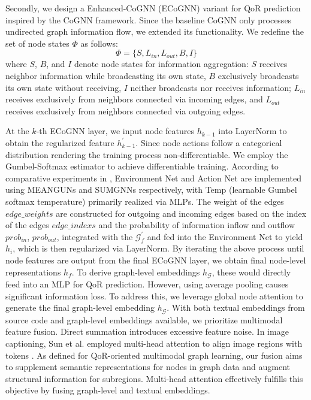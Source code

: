 \documentclass[conference]{IEEEtran}
\begin{document}
		Secondly, we design a Enhanced-CoGNN (ECoGNN) variant for QoR prediction inspired by the CoGNN \cite{Finkelshtein2024} framework. Since the baseline CoGNN only processes undirected graph information flow, we extended its functionality. We redefine the set of node states $\Phi$ as follows:
		\begin{equation}
			\Phi = \{S, L_{in}, L_{out}, B, I\}
		\end{equation}
		where $S$, $B$, and $I$ denote node states for information aggregation: $S$ receives neighbor information while broadcasting its own state, $B$ exclusively broadcasts its own state without receiving, $I$ neither broadcasts nor receives information; $L_{in}$ receives exclusively from neighbors connected via incoming edges, and $L_{out}$ receives exclusively from neighbors connected via outgoing edges. 
		
		At the $k$-th ECoGNN layer, we input node features $h_{k-1}$ into LayerNorm \cite{Ba2016} to obtain the regularized feature $h_{k-1}^{'}$. Since node actions follow a categorical distribution rendering the training process non-differentiable. We employ the Gumbel-Softmax estimator \cite{Jang2017} to achieve differentiable training. According to comparative experiments in \cite{xu2025}, Environment Net and Action Net are implemented using MEANGUNs \cite{Hamilton} and SUMGNNs \cite{Hamilton} respectively, with Temp (learnable Gumbel softmax temperature) primarily realized via MLPs. The weight of the edges $edge\_weights$ are constructed for outgoing and incoming edges based on the index of the edges $edge\_indexs$  and the probability of information inflow and outflow $prob_{in}$, $prob_{out}$, integrated with the $\mathcal{G}_{f}^{'}$ and fed into the Environment Net to yield $h_{i}$, which is then regularized via LayerNorm. By iterating the above process until node features are output from the final ECoGNN layer, we obtain final node-level representations $h_{f}$. To derive graph-level embeddings $h_{\mathcal{G}}$, these would directly feed into an MLP for QoR prediction. However, using average pooling causes significant information loss. To address this, we leverage global node attention \cite{Li2016} to generate the final graph-level embedding $h_{\mathcal{G}}$.
        With both textual embeddings from source code and graph-level embeddings available, we prioritize multimodal feature fusion. Direct summation introduces excessive feature noise. In image captioning, Sun et al. employed multi-head attention to align image regions with tokens \cite{bao2022}. As defined for QoR-oriented multimodal graph learning, our fusion aims to supplement semantic representations for nodes in graph data and augment structural information for subregions. Multi-head attention \cite{vaswani2023} effectively fulfills this objective by fusing graph-level and textual embeddings. 
		
\end{document}
